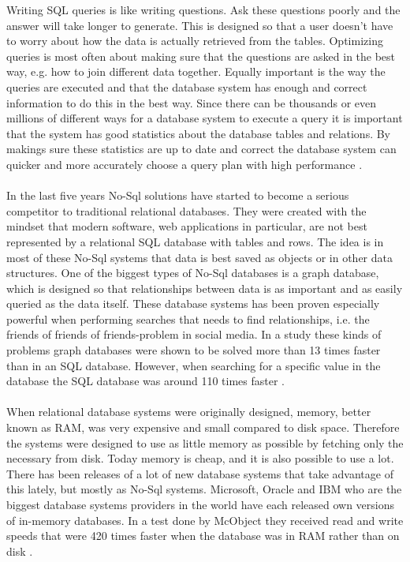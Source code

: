 \documentclass{cslthse-msc}
\begin{document}
Writing SQL queries is like writing questions. Ask these questions poorly and the answer will take longer to generate. This is designed so that a user doesn't have to worry about how the data is actually retrieved from the tables. Optimizing queries is most often about making sure that the questions are asked in the best way, e.g. how to join different data together. Equally important is the way the queries are executed and that the database system has enough and correct information to do this in the best way. Since there can be thousands or even millions of different ways for a database system to execute a query it is important that the system has good statistics about the database tables and relations. By makings sure these statistics are up to date and correct the database system can quicker and more accurately choose a query plan with high performance \cite{Nevarez}.\\\\
In the last five years No-Sql solutions have started to become a serious competitor to traditional relational databases. They were created with the mindset that modern software, web applications in particular, are not best represented by a relational SQL database with tables and rows. The idea is in most of these No-Sql systems that data is best saved as objects or in other data structures. One of the biggest types of No-Sql databases is a graph database, which is designed so that relationships between data is as important and as easily queried as the data itself. These database systems has been proven especially powerful when performing searches that needs to find relationships, i.e. the friends of friends of friends-problem in social media. In a study these kinds of problems graph databases were shown to be solved more than 13 times faster than in an SQL database. However, when searching for a specific value in the database the SQL database was around 110 times faster \cite{vicknair2010comparison}.\\\\
When relational database systems were originally designed, memory, better known as RAM, was very expensive and small compared to disk space. Therefore the systems were designed to use as little memory as possible by fetching only the necessary from disk. Today memory is cheap, and it is also possible to use a lot. There has been releases of a lot of new database systems that take advantage of this lately, but mostly as No-Sql systems. Microsoft, Oracle and IBM who are the biggest database systems providers in the world have each released own versions of in-memory databases. In a test done by McObject they received read and write speeds that were 420 times faster when the database was in RAM rather than on disk \cite{mcobject}.\\\\
\end{document}
